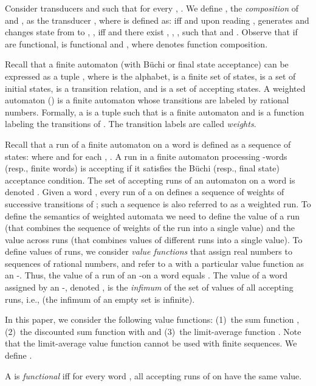  Consider transducers  and   such that for every , .  We define
, the \emph{composition} of  and ,
as the transducer , where  is defined as:
   iff  and upon reading ,  generates  and 
changes state from  to , \ie, iff  and there exist
, , , 
 such that  and 
.  Observe that if  are functional,
 is functional and , where  
 denotes function composition.
\medskip

 Recall that a finite automaton (with B{\"u}chi or 
final state acceptance) can be expressed as a 
tuple , where  is the alphabet,  is a finite
set of states,  is a set of initial states,  is a transition relation, and  is a set
of accepting states.  A weighted automaton (\wa) is a finite automaton whose transitions
are labeled by rational numbers.  Formally, a \wa  is a tuple  such that  is a finite automaton
and  is a function labeling the transitions of . 
The transition labels are called \emph{weights}.

Recall that a run  of a finite automaton on a word  is defined as a sequence of states:  
where  and for each  , .  A run  in a finite automaton processing 
-words (resp., finite words) is accepting if it satisfies 
the B{\"u}chi (resp., final state) acceptance condition. 
The set of accepting
runs of an automaton on a word  is denoted . Given a word ,
every run  of a \wa  on  defines a sequence
 of weights of
successive transitions of ; such a sequence is also referred to as a
weighted run.  To define the semantics of weighted automata we need to define
the value of a run (that combines the sequence of weights of the run into a
single value) and the value across runs (that combines values of different runs
into a single value).  To define values of runs, we consider \emph{value
functions}  that assign real numbers to sequences of rational numbers, and
refer to a \wa with a particular value function  as an -\wa.  Thus, the
value  of a run  of an -\wa  on a word  equals .
The value of a word  assigned by an -\wa , denoted
, is the {\em infimum} of the set of values of all accepting
runs, i.e.,  (the
infimum of an empty set is infinite).  


In this paper, we consider the following value
functions: (1)~the sum function , (2)~the discounted sum function  with  
and (3)~the limit-average
function . Note that the limit-average value function cannot be 
used with finite sequences. We define .

A \wa  is \emph{functional} iff for every word ,
all accepting runs of  on  have the same value. 



